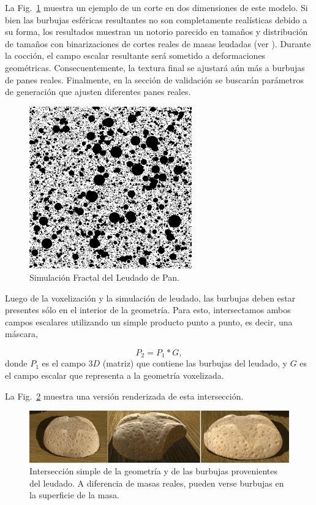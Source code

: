 La Fig.~\ref{FigProving} muestra un ejemplo de un corte en dos dimensiones de este modelo.
Si bien las burbujas esféricas resultantes no son completamente realísticas debido a su forma, los resultados muestran un notorio parecido en tamaños y distribución de tamaños con binarizaciones de cortes reales de masas leudadas (ver \cite{Babin2006}).
Durante la cocción, el campo escalar resultante será sometido a deformaciones geométricas. Consecuentemente, la textura final se ajustará aún más a burbujas de panes reales.
Finalmente, en la sección de validación se buscarán parámetros de generación que ajusten diferentes panes reales. 

\begin{figure}
\center
\includegraphics[width=7cm]{figures/bubbles}
\caption{Simulación Fractal del Leudado de Pan.}
\label{FigProving}
\end{figure}

Luego de la voxelización y la simulación de leudado, las burbujas deben estar presentes sólo en el interior de la geometría.
Para esto, intersectamos ambos campos escalares utilizando un simple producto punto a punto, es decir, una máscara,

\begin{equation*}
P_{2} = P_{1} * G,
\end{equation*}
%
donde $P_{1}$ es el campo $3D$ (matriz) que contiene las burbujas del leudado, y $G$ es el campo escalar que representa a la geometría voxelizada.

La Fig.~\ref{fg:intersectProblem} muestra una versión renderizada de esta intersección.

\begin{figure}
\includegraphics[width=13cm]{figures/intersectProblem}
\caption[Intersección simple de la geometría y de las burbujas provenientes del leudado]{Intersección simple de la geometría y de las burbujas provenientes del leudado. A diferencia de masas reales, pueden verse burbujas en la superficie de la masa.}
\label{fg:intersectProblem}
\end{figure}

